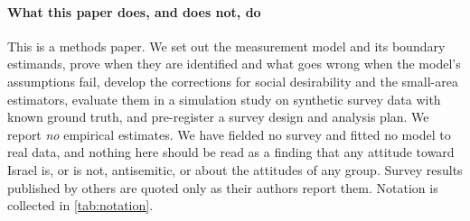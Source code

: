 \paragraph{What this paper does, and does not, do}
This is a methods paper. We set out the measurement model and its boundary
estimands, prove when they are identified and what goes wrong when the
model's assumptions fail, develop the corrections for social desirability and
the small-area estimators, evaluate them in a simulation study on synthetic
survey data with known ground truth, and pre-register a survey design and
analysis plan. We report \emph{no} empirical estimates. We have fielded no
survey and fitted no model to real data, and nothing here should be read as a
finding that any attitude toward Israel is, or is not, antisemitic, or about
the attitudes of any group. Survey results published by others are quoted
only as their authors report them. Notation is collected in
\cref{tab:notation}.

%
